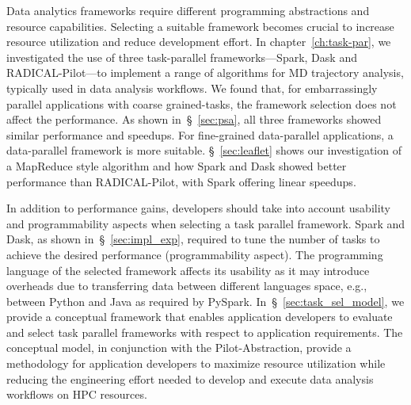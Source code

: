 Data analytics frameworks require different programming abstractions and
resource capabilities. Selecting a suitable framework becomes crucial to
increase resource utilization and reduce development effort.
In chapter~\ref{ch:task-par}, we investigated the use of three task-parallel
frameworks---Spark, Dask and RADICAL-Pilot---to implement a range of algorithms
for MD trajectory analysis, typically used in data analysis workflows. We found
that, for embarrassingly parallel applications with coarse  grained-tasks, the
framework selection does not affect the performance. As shown
in~\S~\ref{sec:psa}, all three frameworks showed similar performance and
speedups. For fine-grained data-parallel applications, a  data-parallel
framework is more suitable. \S~\ref{sec:leaflet} shows our investigation of a
MapReduce style algorithm and how Spark and Dask showed better performance than
RADICAL-Pilot, with Spark offering linear speedups.

In addition to performance gains, developers should take into account usability
and programmability aspects when selecting a task parallel framework. Spark and
Dask, as shown in~\S~\ref{sec:impl_exp}, required to tune the number of tasks to
achieve the desired performance (programmability aspect). The programming
language of the selected framework affects its usability as it may introduce
overheads due to transferring data between different languages space, e.g.,
between Python and Java as required by PySpark. In~\S~\ref{sec:task_sel_model},
we provide a conceptual framework that enables application developers to
evaluate and select task parallel frameworks with respect to application
requirements. The conceptual model, in conjunction with the Pilot-Abstraction,
provide a methodology for application developers to maximize resource utilization
while reducing the engineering effort needed to develop and execute data analysis
workflows on HPC resources.


